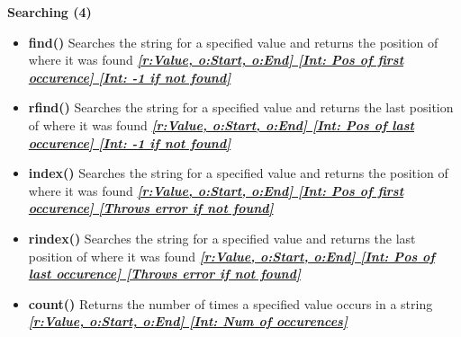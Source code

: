 \documentclass{report}
\begin{document}
    \pagebreak \bigbreak \noindent
    
      \begin{center}
        \textbf{Searching (4)}
      \end{center}
      \begin{itemize}
        \item[\ding{43}] \textbf{find()}	Searches the string for a specified value and returns the position of where it was found 
          \smallbreak
          \textbf{\textit{\underline{[r:Value, o:Start, o:End] [Int: Pos of first occurence] [Int: -1 if not found]}}}
          \smallbreak
        \item[\ding{43}] \textbf{rfind()}	Searches the string for a specified value and returns the last position of where it was found 
          \smallbreak \noindent 
          \textbf{\textit{\underline{[r:Value, o:Start, o:End] [Int: Pos of last occurence] [Int: -1 if not found]}}}
          \smallbreak
        \item[\ding{43}] \textbf{index()}	Searches the string for a specified value and returns the position of where it was found 
          \smallbreak
          \textbf{\textit{\underline{[r:Value, o:Start, o:End] [Int: Pos of first occurence] [Throws error if not found]}}}
          \smallbreak
        \item[\ding{43}] \textbf{rindex()}	Searches the string for a specified value and returns the last position of where it was found 
          \smallbreak \noindent 
          \textbf{\textit{\underline{[r:Value, o:Start, o:End] [Int: Pos of last occurence] [Throws error if not found]}}}
        \smallbreak
      \item[\ding{43}] \textbf{count()}	Returns the number of times a specified value occurs in a string
        \smallbreak
        \textbf{\textit{\underline{[r:Value, o:Start, o:End] [Int: Num of occurences]}}}

      \end{itemize}
    

    \bigbreak \noindent 
    
\end{document}
